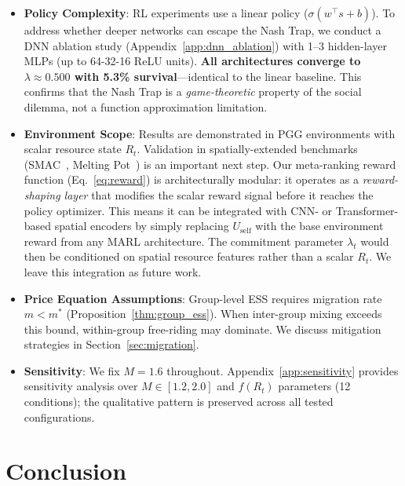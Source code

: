 \documentclass{article}
\begin{document}
\begin{itemize}
    \item \textbf{Policy Complexity}: RL experiments use a linear policy ($\sigma(w^\top s + b)$).
    To address whether deeper networks can escape the Nash Trap, we conduct a DNN ablation study (Appendix~\ref{app:dnn_ablation}) with 1--3 hidden-layer MLPs (up to 64-32-16 ReLU units).
    \textbf{All architectures converge to $\lambda \approx 0.500$ with 5.3\% survival}---identical to the linear baseline.
    This confirms that the Nash Trap is a \emph{game-theoretic} property of the social dilemma, not a function approximation limitation.
    \item \textbf{Environment Scope}: Results are demonstrated in PGG environments with scalar resource state $R_t$.
    Validation in spatially-extended benchmarks (SMAC~\citep{samvelyan2019starcraft}, Melting Pot~\citep{leibo2021scalable}) is an important next step.
    Our meta-ranking reward function (Eq.~\ref{eq:reward}) is architecturally modular: it operates as a \emph{reward-shaping layer} that modifies the scalar reward signal before it reaches the policy optimizer.
    This means it can be integrated with CNN- or Transformer-based spatial encoders by simply replacing $U_{\text{self}}$ with the base environment reward from any MARL architecture.
    The commitment parameter $\lambda_t$ would then be conditioned on spatial resource features rather than a scalar $R_t$.
    We leave this integration as future work.
    \item \textbf{Price Equation Assumptions}: Group-level ESS requires migration rate $m < m^*$ (Proposition~\ref{thm:group_ess}).
    When inter-group mixing exceeds this bound, within-group free-riding may dominate.
    We discuss mitigation strategies in Section~\ref{sec:migration}.
    \item \textbf{Sensitivity}: We fix $M=1.6$ throughout.
    Appendix~\ref{app:sensitivity} provides sensitivity analysis over $M \in [1.2, 2.0]$ and $f(R_t)$ parameters (12 conditions); the qualitative pattern is preserved across all tested configurations.
\end{itemize}

\section{Conclusion}
\end{document}
